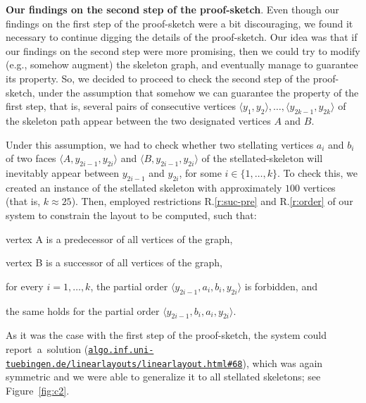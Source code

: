 \documentclass[runningheads]{llncs}
\newcommand{\myparagraph}[1]{\medskip\noindent\textbf{#1}.}
\newcommand\rurl[1]{\href{http://#1}{\nolinkurl{#1}}}
\begin{document}
\myparagraph{Our findings on the second step of the proof-sketch} Even though our findings on the first step of the proof-sketch were a bit discouraging, we found it necessary to continue digging the details of the proof-sketch. Our idea was that if our findings on the second step were more promising, then we could try to modify (e.g., somehow augment) the skeleton graph, and eventually manage to guarantee its property. So, we decided to proceed to check the second step of the proof-sketch, under the assumption that somehow we can guarantee the property of the first step, that is, several pairs of consecutive vertices $\langle y_1,y_2 \rangle, \ldots, \langle y_{2k-1}, y_{2k} \rangle$ of the skeleton path appear between the two designated vertices $A$ and $B$. 

Under this assumption, we had to check whether two stellating vertices $a_i$ and $b_i$ of two faces $\langle A, y_{2i-1}, y_{2i}\rangle$ and $\langle B, y_{2i-1}, y_{2i}\rangle$ of the stellated-skeleton will inevitably appear between $y_{2i-1}$ and $y_{2i}$, for some $i\in\{1,\ldots,k\}$. To check this, we created an instance of the stellated skeleton with approximately $100$ vertices (that is, $k \approx 25$). Then, employed restrictions R.\ref{r:suc-pre} and R.\ref{r:order} of our system to constrain the layout to be computed, such that: 
%
\begin{inparaenum}[(i)]
\item vertex A is a predecessor of all vertices of the graph,
\item vertex B is a successor of all vertices of the graph,
\item for every $i=1,\ldots,k$, the partial order $\langle y_{2i-1}, a_i, b_i, y_{2i} \rangle$ is forbidden, and
\item the same holds for the partial order $\langle y_{2i-1}, b_i, a_i, y_{2i} \rangle$.
\end{inparaenum} 
%
As it was the case with the first step of the proof-sketch, the system could report~a~solution (\rurl{algo.inf.uni-tuebingen.de/linearlayouts/linearlayout.html\#68}), which was again symmetric and we were able to generalize it to all stellated skeletons; see Figure~\ref{fig:c2}.
\end{document}
